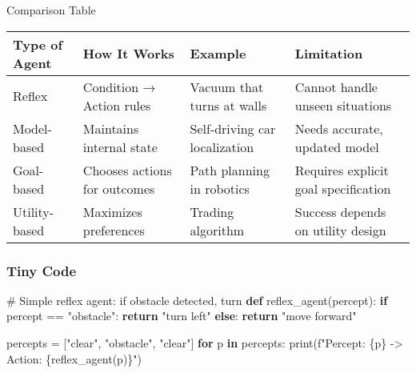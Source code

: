 \documentclass[
  letterpaper,
  DIV=11,
  numbers=noendperiod]{scrreprt}
\newenvironment{Shaded}{\begin{snugshade}}{\end{snugshade}}
\newcommand{\BuiltInTok}[1]{\textcolor[rgb]{0.00,0.23,0.31}{#1}}
\newcommand{\CommentTok}[1]{\textcolor[rgb]{0.37,0.37,0.37}{#1}}
\newcommand{\ControlFlowTok}[1]{\textcolor[rgb]{0.00,0.23,0.31}{\textbf{#1}}}
\newcommand{\KeywordTok}[1]{\textcolor[rgb]{0.00,0.23,0.31}{\textbf{#1}}}
\newcommand{\NormalTok}[1]{\textcolor[rgb]{0.00,0.23,0.31}{#1}}
\newcommand{\OperatorTok}[1]{\textcolor[rgb]{0.37,0.37,0.37}{#1}}
\newcommand{\SpecialCharTok}[1]{\textcolor[rgb]{0.37,0.37,0.37}{#1}}
\newcommand{\SpecialStringTok}[1]{\textcolor[rgb]{0.13,0.47,0.30}{#1}}
\newcommand{\StringTok}[1]{\textcolor[rgb]{0.13,0.47,0.30}{#1}}
\begin{document}
Comparison Table

\begin{longtable}[]{@{}
  >{\raggedright\arraybackslash}p{}
  >{\raggedright\arraybackslash}p{}
  >{\raggedright\arraybackslash}p{}
  >{\raggedright\arraybackslash}p{}@{}}
\toprule\noalign{}
\begin{minipage}[b]{\linewidth}\raggedright
Type of Agent
\end{minipage} & \begin{minipage}[b]{\linewidth}\raggedright
How It Works
\end{minipage} & \begin{minipage}[b]{\linewidth}\raggedright
Example
\end{minipage} & \begin{minipage}[b]{\linewidth}\raggedright
Limitation
\end{minipage} \\
\midrule\noalign{}
\endhead
\bottomrule\noalign{}
\endlastfoot
Reflex & Condition → Action rules & Vacuum that turns at walls & Cannot
handle unseen situations \\
Model-based & Maintains internal state & Self-driving car localization &
Needs accurate, updated model \\
Goal-based & Chooses actions for outcomes & Path planning in robotics &
Requires explicit goal specification \\
Utility-based & Maximizes preferences & Trading algorithm & Success
depends on utility design \\
\end{longtable}

\subsubsection{Tiny Code}\label{tiny-code-1}

\begin{Shaded}
\begin{Highlighting}[]
\CommentTok{\# Simple reflex agent: if obstacle detected, turn}
\KeywordTok{def}\NormalTok{ reflex\_agent(percept):}
    \ControlFlowTok{if}\NormalTok{ percept }\OperatorTok{==} \StringTok{"obstacle"}\NormalTok{:}
        \ControlFlowTok{return} \StringTok{"turn left"}
    \ControlFlowTok{else}\NormalTok{:}
        \ControlFlowTok{return} \StringTok{"move forward"}

\NormalTok{percepts }\OperatorTok{=}\NormalTok{ [}\StringTok{"clear"}\NormalTok{, }\StringTok{"obstacle"}\NormalTok{, }\StringTok{"clear"}\NormalTok{]}
\ControlFlowTok{for}\NormalTok{ p }\KeywordTok{in}\NormalTok{ percepts:}
    \BuiltInTok{print}\NormalTok{(}\SpecialStringTok{f"Percept: }\SpecialCharTok{\{}\NormalTok{p}\SpecialCharTok{\}}\SpecialStringTok{ {-}\textgreater{} Action: }\SpecialCharTok{\{}\NormalTok{reflex\_agent(p)}\SpecialCharTok{\}}\SpecialStringTok{"}\NormalTok{)}
\end{Highlighting}
\end{Shaded}
\end{document}
